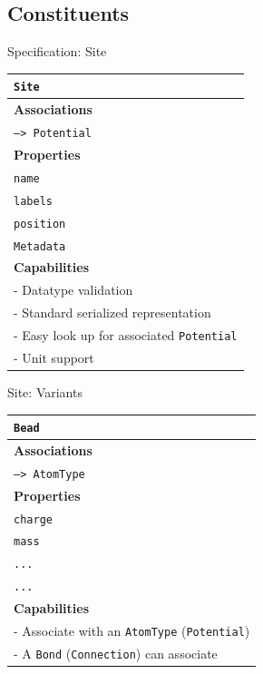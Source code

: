 \documentclass[xcolor=table]{beamer}
\begin{document}
\subsection{Constituents}
\begin{frame}{Specification: Site}
\begin{table}[ht]
    \centering
    \begin{tabular}{|l|}
         \hline
         \rowcolor{gray!50}
         \texttt{Site}  \\
         \hline
         \textbf{Associations} \\
         \hline
         \texttt{--> Potential}\\
         \textbf{Properties}\\
         \hline
         \texttt{name} \\
         \texttt{labels} \\
         \texttt{position}\\
         \texttt{Metadata}\\
         \hline
         \textbf{Capabilities}\\
         \hline
         - Datatype validation \\
         - Standard serialized representation \\
         - Easy look up for associated \texttt{Potential} \\
         - Unit support \\
        \hline
    \end{tabular}
    \label{tab:SiteSpec}
\end{table}

\end{frame}

\begin{frame}{Site: Variants}
\begin{table}[ht]
    \centering
    \begin{tabular}{|l|}

         \hline
         \rowcolor{gray!50}
         \texttt{Bead}  \\
         \hline
         \textbf{Associations} \\
         \hline
         \texttt{--> AtomType}\\
         \textbf{Properties}\\
         \hline
         \texttt{charge} \\
         \texttt{mass} \\
         \texttt{...}\\
         \texttt{...}\\
         \hline
         \textbf{Capabilities}\\
         \hline
        - Associate with an \texttt{AtomType} (\texttt{Potential})\\
        - A \texttt{Bond} (\texttt{Connection}) can associate\\
        \hline
    \end{tabular}

\end{table}
\end{frame}
\end{document}
